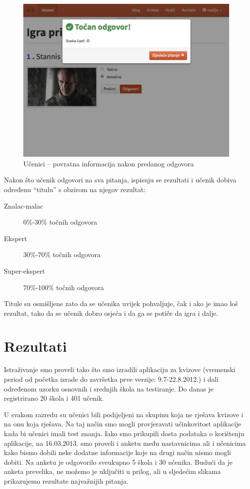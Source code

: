 \documentclass{scrreprt}
\begin{document}
\begin{figure}[H]
  \includegraphics[width=\textwidth, clip=true, trim=0 7cm 0 0, fbox]{student/boolean_question_correct}
  \caption{Učenici -- povratna informacija nakon predanog odgovora}
\end{figure}

Nakon što učenik odgovori na sva pitanja, ispisuju se rezultati i učenik dobiva
određenu ``titulu'' s obzirom na njegov rezultat:

\begin{description}
  \item[Znalac-malac] 0\%-30\% točnih odgovora
  \item[Ekspert] 30\%-70\% točnih odgovora
  \item[Super-ekspert] 70\%-100\% točnih odgovora
\end{description}

Titule su osmišljene zato da se učenika uvijek pohvaljuje, čak i ako je imao loš
rezultat, tako da se učenik dobro osjeća i da ga se potiče da igra i dalje.

\chapter{Rezultati}
\label{chap:results}

Istraživanje smo proveli tako što smo izradili aplikaciju za kvizove (vremenski
period od početka izrade do završetka prve verzije: 9.7-22.8.2012.) i dali
određenom uzorku osnovnih i srednjih škola na testiranje. Do danas je
registrirano 20 škola i 401 učenik.

U svakom razredu su učenici bili podijeljeni na skupinu koja ne rješava kvizove
i na onu koja rješava. Na taj način smo mogli provjeravati učinkovitost
aplikacije kada bi učenici imali test znanja. Iako smo prikupili dosta podataka
o korištenju aplikacije, na 16.03.2013. smo proveli i anketu među nastavnicima
ali i učenicima kako bismo dobili neke dodatne informacije koje na drugi način
nismo mogli dobiti. Na anketu je odgovorilo sveukupno 5 škola i 30 učenika.
Budući da je anketa prevelika, ne možemo je uključiti u prilog, ali u sljedećim
slikama prikazujemo rezultate najvažnijih pitanja.
\end{document}
